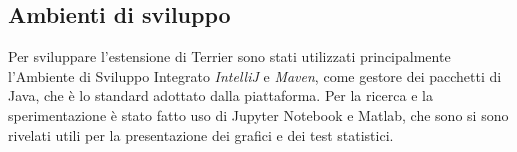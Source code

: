 \subsection{Ambienti di sviluppo}
Per sviluppare l'estensione di Terrier sono stati utilizzati principalmente
l'Ambiente di Sviluppo Integrato \textit{IntelliJ} e \textit{Maven},
come gestore dei pacchetti di Java, che
è lo standard adottato dalla piattaforma.
Per la ricerca e la sperimentazione è stato fatto uso di Jupyter Notebook
e Matlab, che sono si sono rivelati utili per la presentazione dei grafici
e dei test statistici.
